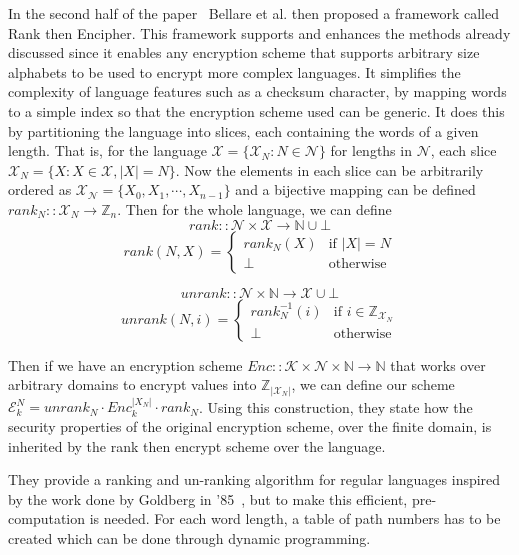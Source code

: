 \documentclass[ %
                    author={Samuel Russell},
                supervisor={Prof. Bogdan Warinschi},
                    degree={MEng},
                     title={Innocuous Ciphertexts},
                  subtitle={The DE-CENSOR Scheme},
                      type={research},
                      year={2018} ]{dissertation}
\begin{document}
In the second half of the paper~\cite{fpe} Bellare et al. then proposed a framework called Rank then Encipher. This framework supports and enhances the methods already discussed since it enables any encryption scheme that supports arbitrary size alphabets to be used to encrypt more complex languages. It simplifies the complexity of language features such as a checksum character, by mapping words to a simple index so that the encryption scheme used can be generic. It does this by partitioning the language into slices, each containing the words of a given length. That is, for the language $\mathcal{X} = \{\mathcal{X}_N : N \in \mathcal{N} \}$ for lengths in $\mathcal{N}$, each slice $\mathcal{X}_N = \{ X : X \in \mathcal{X}, \vert X \vert = N  \}$. Now the elements in each slice can be arbitrarily ordered as $\mathcal{X_N} = \{ X_0, X_1, \cdots , X_{n-1} \} $ and a bijective mapping can be defined $rank_N :: \mathcal{X}_N \rightarrow \mathbb{Z}_n$.
Then for the whole language, we can define
$$ rank :: \mathcal{N} \times \mathcal{X} \rightarrow \mathbb{N} \cup \bot $$
$$ rank(N,X) =
\left\{
    \begin{array}{ll}
        rank_N(X)  & \mbox{if } \vert X \vert = N\\
        \bot & \mbox{otherwise}
    \end{array}
\right.
$$

$$ unrank :: \mathcal{N} \times \mathbb{N} \rightarrow \mathcal{X} \cup \bot $$
$$ unrank(N,i) =
\left\{
    \begin{array}{ll}
        rank_N^{-1}(i)  & \mbox{if } i \in \mathbb{Z}_{\mathcal{X}_N}\\
        \bot & \mbox{otherwise}
    \end{array}
\right.
$$

Then if we have an encryption scheme $Enc :: \mathcal{K} \times \mathcal{N} \times \mathbb{N} \rightarrow \mathbb{N}$ that works over arbitrary domains to encrypt values into $\mathbb{Z}_{|\mathcal{X}_N|}$, we can define our scheme $\mathcal{E}_k^N = unrank_N \cdot Enc_k^{|X_N|} \cdot rank_N$. Using this construction, they state how the security properties of the original encryption scheme, over the finite domain, is inherited by the rank then encrypt scheme over the language.

They provide a ranking and un-ranking algorithm for regular languages inspired by the work done by Goldberg in '85~\cite{rank}, but to make this efficient, pre-computation is needed. For each word length, a table of path numbers has to be created which can be done through dynamic programming.
\end{document}
